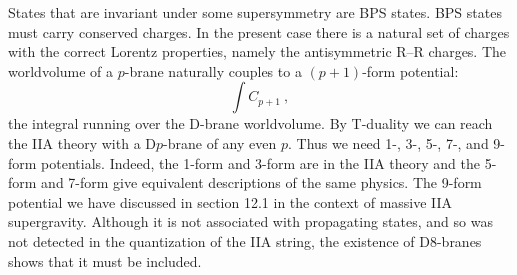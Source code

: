 States that are invariant under some supersymmetry are BPS states. BPS states must carry conserved charges. In the present case there is a natural set of charges with the correct Lorentz properties, namely the antisymmetric R--R charges. The worldvolume of a $p$-brane naturally couples to a $(p + 1)$-form potential:
\begin{equation}
	\int C_{p+1} \:, \label{13.2.7}
\end{equation}
the integral running over the D-brane worldvolume. By T-duality we can reach the IIA theory with a D$p$-brane of any even $p$. Thus we need 1-, 3-, 5-, 7-, and 9-form potentials. Indeed, the 1-form and 3-form are in the IIA theory and the 5-form and 7-form give equivalent descriptions of the same physics. The 9-form potential we have discussed in section 12.1 in the context of massive IIA supergravity. Although it is not associated with propagating states, and so was not detected in the quantization of the IIA string, the existence of D8-branes shows that it must be included.

